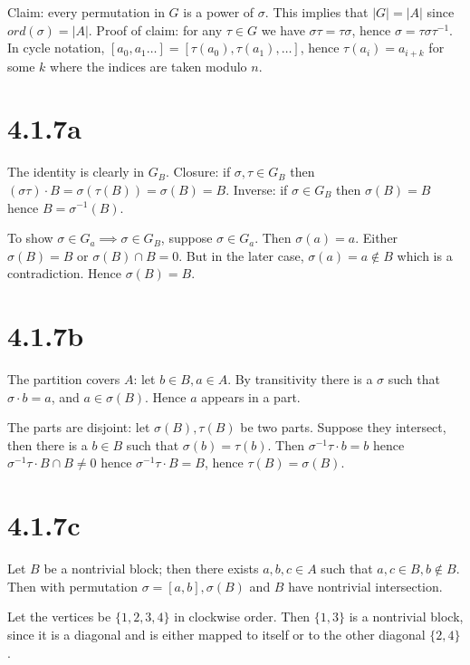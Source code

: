 \documentclass{article}
\def\inv{{-1}}
\begin{document}
Claim: every permutation in $G$ is a power of $\sigma$. This implies that $|G| = |A|$ since $ord(\sigma) = |A|$. Proof of claim: for any $\tau \in G$ we have $\sigma \tau = \tau \sigma$, hence $\sigma = \tau \sigma \tau^\inv$. In cycle notation, $[a_0, a_1 \ldots] = [\tau(a_0), \tau(a_1), \ldots]$, hence $\tau(a_i) = a_{i+k}$ for some $k$ where the indices are taken modulo $n$.

\section*{4.1.7a}

The identity is clearly in $G_B$. Closure: if $\sigma, \tau \in G_B$ then $(\sigma \tau) \cdot B = \sigma(\tau(B)) = \sigma(B) = B$. Inverse: if $\sigma \in G_B$ then $\sigma(B) = B$ hence $B = \sigma^\inv(B)$.

To show $\sigma \in G_a \implies \sigma \in G_B$, suppose $\sigma \in G_a$. Then $\sigma(a) = a$. Either $\sigma(B) = B$ or $\sigma(B) \cap B = 0$. But in the later case, $\sigma(a) = a \not\in B$ which is a contradiction. Hence $\sigma(B) = B$.

\section*{4.1.7b}

The partition covers $A$: let $b \in B, a \in A$. By transitivity there is a $\sigma$ such that $\sigma \cdot b = a$, and $a \in \sigma (B)$. Hence $a$ appears in a part.

The parts are disjoint: let $\sigma(B), \tau(B)$ be two parts. Suppose they intersect, then there is a $b \in B$ such that $\sigma(b) = \tau(b)$. Then $\sigma^\inv \tau \cdot b = b$ hence $\sigma^\inv \tau \cdot B \cap B \ne 0$ hence $\sigma^\inv \tau \cdot B = B$, hence $\tau(B) = \sigma(B)$.

\section*{4.1.7c}

Let $B$ be a nontrivial block; then there exists $a, b, c \in A$ such that $a, c \in B, b \not\in B$. Then with permutation $\sigma = [a, b], \sigma(B)$ and $B$ have nontrivial intersection.

Let the vertices be $\{1, 2, 3, 4\}$ in clockwise order. Then $\{1, 3\}$ is a nontrivial block, since it is a diagonal and is either mapped to itself or to the other diagonal $\{2, 4\}$.
\end{document}
